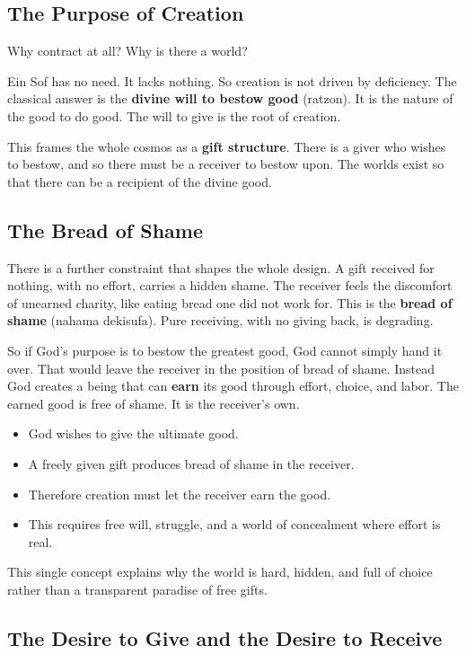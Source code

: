 \subsection{The Purpose of Creation}

Why contract at all? Why is there a world?

Ein Sof has no need. It lacks nothing. So creation is not driven by deficiency. The
classical answer is the \textbf{divine will to bestow good} (ratzon). It is the nature
of the good to do good. The will to give is the root of creation.

This frames the whole cosmos as a \textbf{gift structure}. There is a giver who
wishes to bestow, and so there must be a receiver to bestow upon. The worlds exist so
that there can be a recipient of the divine good.

\subsection{The Bread of Shame}

There is a further constraint that shapes the whole design. A gift received for
nothing, with no effort, carries a hidden shame. The receiver feels the discomfort of
unearned charity, like eating bread one did not work for. This is the \textbf{bread
of shame} (nahama dekisufa). Pure receiving, with no giving back, is
degrading.

So if God's purpose is to bestow the greatest good, God cannot simply hand it over.
That would leave the receiver in the position of bread of shame. Instead God creates a
being that can \textbf{earn} its good through effort, choice, and labor. The earned
good is free of shame. It is the receiver's own.

\begin{itemize}
 \item God wishes to give the ultimate good.
 \item A freely given gift produces bread of shame in the receiver.
 \item Therefore creation must let the receiver earn the good.
 \item This requires free will, struggle, and a world of concealment where effort is
 real.
\end{itemize}

This single concept explains why the world is hard, hidden, and full of choice rather
than a transparent paradise of free gifts.

\subsection{The Desire to Give and the Desire to Receive}

